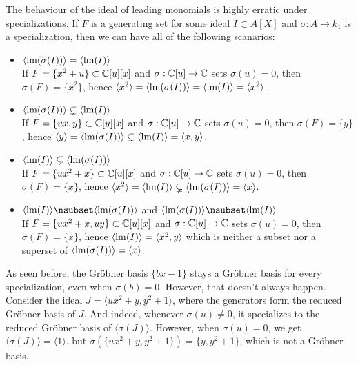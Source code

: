 \begin{example}\upshape
  The behaviour of the ideal of leading monomials is highly erratic under specializations. If $F$ is a generating set for some ideal $I \subset A[X]$ and $\sigma : A \to k_{1}$ is a specialization, then we can have all of the following scanarios:
  \begin{itemize}
    \item $\langle \operatorname{lm}(\sigma(I)) \rangle = \langle \operatorname{lm}(I) \rangle$ \\ If $F = \{x^{2} + u\} \subset \mathbb{C}[u][x]$ and $\sigma : \mathbb{C}[u] \to \mathbb{C}$ sets $\sigma(u) = 0$, then $\sigma(F) = \{x^{2}\}$, hence $\langle x^{2} \rangle = \langle \operatorname{lm}(\sigma(I)) \rangle = \langle \operatorname{lm}(I) \rangle = \langle x^{2} \rangle$.

    \item $\langle \operatorname{lm}(\sigma(I)) \rangle \subsetneq \langle \operatorname{lm}(I) \rangle$ \\ If $F = \{ux, y\} \subset \mathbb{C}[u][x]$ and $\sigma : \mathbb{C}[u] \to \mathbb{C}$ sets $\sigma(u) = 0$, then $\sigma(F) = \{y\}$, hence $\langle y \rangle = \langle \operatorname{lm}(\sigma(I)) \rangle \subsetneq \langle \operatorname{lm}(I) \rangle = \langle x, y \rangle$.

    \item $\langle \operatorname{lm}(I) \rangle \subsetneq \langle \operatorname{lm}(\sigma(I)) \rangle$ \\ If $F = \{ux^{2} + x\} \subset \mathbb{C}[u][x]$ and $\sigma : \mathbb{C}[u] \to \mathbb{C}$ sets $\sigma(u) = 0$, then $\sigma(F) = \{x\}$, hence $\langle x^{2} \rangle = \langle \operatorname{lm}(I) \rangle \subsetneq \langle \operatorname{lm}(\sigma(I)) \rangle = \langle x \rangle$.

    \item $\langle \LM(I) \rangle \nsubset \langle \LM(\sigma(I)) \rangle$ and $\langle \LM(\sigma(I)) \rangle \nsubset \langle \LM(I) \rangle$ \\ If $F = \{ux^{2} + x, uy\} \subset \mathbb{C}[u][x]$ and $\sigma : \mathbb{C}[u] \to \mathbb{C}$ sets $\sigma(u) = 0$, then $\sigma(F) = \{x\}$, hence $\langle \operatorname{lm}(I) \rangle = \langle x^{2}, y \rangle$ which is neither a subset nor a superset of $\langle \operatorname{lm}(\sigma(I)) \rangle = \langle x \rangle$.
  \end{itemize}

  As seen before, the Gröbner basis $\{bx - 1\}$ stays a Gröbner basis for every specialization, even when $\sigma(b) = 0$. However, that doesn't always happen. Consider the ideal $J = \langle ux^{2} + y, y^{2} + 1 \rangle$, where the generators form the reduced Gröbner basis of $J$. And indeed, whenever $\sigma(u) \neq 0$, it specializes to the reduced Gröbner basis of $\langle \sigma(J) \rangle$. However, when $\sigma(u) = 0$, we get $\langle \sigma(J) \rangle = \langle 1 \rangle$, but $\sigma(\{ux^{2} + y, y^{2} + 1\}) = \{y, y^{2} + 1\}$, which is not a Gröbner basis.
\end{example}

